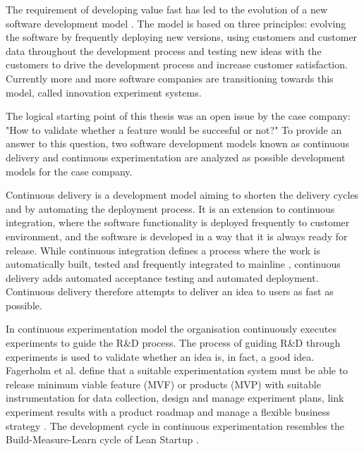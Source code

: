 \documentclass[english]{tktltiki2}
\theoremstyle{definition}
\theoremstyle{remark}
\begin{document}
The requirement of developing value fast has led to the evolution of a new software development model \cite{bosch2012building}. The model is based on three principles: evolving the software by frequently deploying new versions, using customers and customer data throughout the development process and testing new ideas with the customers to drive the development process and increase customer satisfaction. Currently more and more software companies are transitioning towards this model, called innovation experiment systems. 

The logical starting point of this thesis was an open issue by the case company: "How to validate whether a feature would be succesful or not?" To provide an answer to this question, two software development models known as continuous delivery and continuous experimentation are analyzed as possible development models for the case company.


Continuous delivery is a development model aiming to shorten the delivery cycles and by automating the deployment process. It is an extension to continuous integration, where the software functionality is deployed frequently to customer environment, and the software is developed in a way that it is always ready for release. While continuous integration defines a process where the work is automatically built, tested and frequently integrated to mainline \cite{fowler2006continuous}, continuous delivery adds automated acceptance testing and automated deployment. Continuous delivery therefore attempts to deliver an idea to users as fast as possible.

In continuous experimentation model the organisation continuously executes experiments to guide the R\&D process. The process of guiding R\&D through experiments is used to validate whether an idea is, in fact, a good idea. Fagerholm et al. define that a suitable experimentation system must be able to release minimum viable feature (MVF) or products (MVP) with suitable instrumentation for data collection, design and manage experiment plans, link experiment results with a product roadmap and manage a flexible business strategy \cite{fagerholm2014building}. The development cycle in continuous experimentation resembles the Build-Measure-Learn cycle of Lean Startup \cite{ries2011lean}. 
\end{document}
